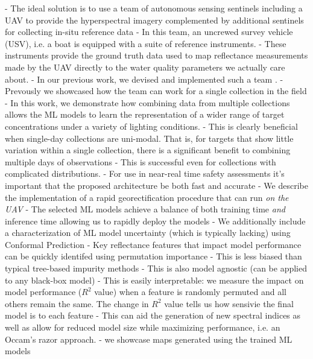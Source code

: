 \documentclass[journal,article,submit,pdftex,moreauthors]{Definitions/mdpi}
\begin{document}
    - The ideal solution is to use a team of autonomous sensing sentinels including a UAV to provide the hyperspectral imagery complemented by additional sentinels for collecting in-situ reference data
    - In this team, an uncrewed survey vehicle (USV), i.e. a boat is equipped with a suite of reference instruments. 
    - These instruments provide the ground truth data used to map reflectance measurements made by the UAV directly to the water quality parameters we actually care about.
- In our previous work, we devised and implemented such a team \cite{robotTeam1}. 
    - Prevously we showcased how the team can work for a single collection in the field 
    - In this work, we demonstrate how combining data from multiple collections allows the ML models to learn the representation of a wider range of target concentrations under a variety of lighting conditions. 
        - This is clearly beneficial when single-day collections are uni-modal. That is, for targets that show little variation within a single collection, there is a significant benefit to combining multiple days of observations 
        - This is successful even for collections with complicated distributions.
    - For use in near-real time safety assessments it's important that the proposed architecture be both fast and accurate
        - We describe the implementation of a rapid georectification procedure that can run \textit{on the UAV}
        - The selected ML models achieve a balance of both training time \textit{and} inference time allowing us to rapidly deploy the models
        - We additionally include a characterization of ML model uncertainty (which is typically lacking) using Conformal Prediction
        - Key reflectance features that impact model performance can be quickly identifed using permutation importance
            - This is less biased than typical tree-based impurity methods 
            - This is also model agnostic (can be applied to any black-box model) 
            - This is easily interpretable: we measure the impact on model performance ($R^2$ value) when a feature is randomly permuted and all others remain the same. The change in $R^2$ value tells us how sensivie the final model is to each feature 
            - This can aid the generation of new spectral indices as well as allow for reduced model size while maximizing performance, i.e. an Occam's razor approach. 
    - we showcase maps generated using the trained ML models
    
    
    



\end{document}
